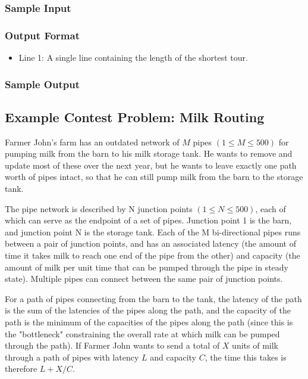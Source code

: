 \subsubsection{Sample Input}

\subsubsection{Output Format}
\begin{itemize}
	\item Line 1: A single line containing the length of the shortest tour. 
\end{itemize}

\subsubsection{Sample Output}

\subsection{Example Contest Problem: Milk Routing}
Farmer John's farm has an outdated network of $M$ pipes $(1 \leq M \leq 500)$ for pumping milk from the barn to his milk storage tank.  
He wants to remove and update most of these over the next year, but he wants to leave exactly one path worth of pipes intact, 
so that he can still pump milk from the barn to the storage tank.

The pipe network is described by N junction points $(1 \leq N \leq 500)$, each of which can serve as the endpoint of a set of pipes.  
Junction point 1 is the barn, and junction point N is the storage tank.  
Each of the M bi-directional pipes runs between a pair of junction points, and has an associated latency 
(the amount of time it takes milk to reach one end of the pipe from the other) and capacity (the amount of milk per unit time
that can be pumped through the pipe in steady state).  
Multiple pipes can connect between the same pair of junction points.

For a path of pipes connecting from the barn to the tank, the latency of the path is the sum of the latencies of the pipes along 
the path, and the capacity of the path is the minimum of the capacities of the pipes along the path (since this is the "bottleneck" 
constraining the overall rate at which milk can be pumped through the path).  
If Farmer John wants to send a total of $X$ units of milk through a path of pipes with latency $L$ and capacity $C$, the time this takes is therefore $L + X/C$.

